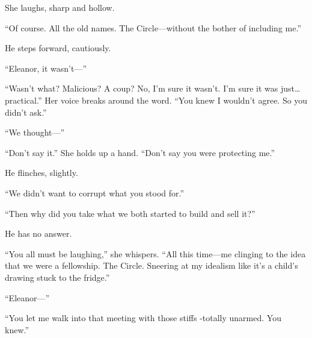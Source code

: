 She laughs, sharp and hollow.

“Of course. All the old names. The Circle—without the bother of including me.”

He steps forward, cautiously.

“Eleanor, it wasn’t—”

“Wasn’t what? Malicious? A coup? No, I’m sure it wasn’t. I’m sure it was just… practical.” Her voice breaks around the word. “You knew I wouldn’t agree. So you didn’t ask.”

“We thought—”

“Don’t say it.” She holds up a hand. “Don’t say you were protecting me.”

% 






He flinches, slightly.

“We didn’t want to corrupt what you stood for.”

“Then why did you take what we both started to build and sell it?”

He has no answer.

“You all must be laughing,” she whispers. “All this time—me clinging to the idea that we were a fellowship. The Circle. Sneering at my idealism like it’s a child’s drawing stuck to the fridge.”

“Eleanor—”

“You let me walk into that meeting with those stiffs -totally unarmed. 
You knew.”

